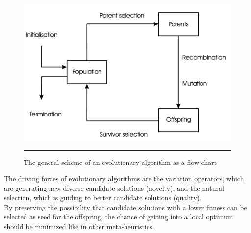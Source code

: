 \begin{figure}
    \centering
    \includegraphics[scale=0.08]{./Figures/eaflowchart.png}
    \rule{20em}{0.5pt}
    \caption{The general scheme of an evolutionary algorithm as a flow-chart \cite{Eiben}}
    \label{fig:eaflowchart}
\end{figure}
The driving forces of evolutionary algorithms are the variation operators, which are generating new diverse candidate solutions (novelty), and the natural selection, which is guiding to better candidate solutions (quality)\cite{Eiben}.\\
By preserving the possibility that candidate solutions with a lower fitness can be selected as seed for the offspring, the chance of getting into a local optimum should be minimized like in other meta-heuristics.\\

